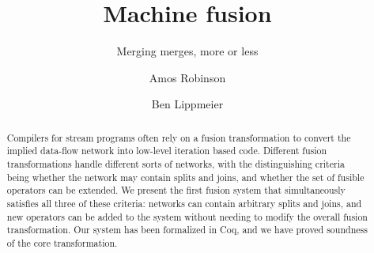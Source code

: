 \documentclass[acmlarge,review]{acmart}\settopmatter{printfolios=true}
\begin{document}
\title{Machine fusion}
\subtitle{Merging merges, more or less}

\author{Amos Robinson}

\author{Ben Lippmeier}

\makeatactive
\begin{abstract}
Compilers for stream programs often rely on a fusion transformation to convert the implied data-flow network into low-level iteration based code. Different fusion transformations handle different sorts of networks, with the distinguishing criteria being whether the network may contain splits and joins, and whether the set of fusible operators can be extended. We present the first fusion system that simultaneously satisfies all three of these criteria: networks can contain arbitrary splits and joins, and new operators can be added to the system without needing to modify the overall fusion transformation. Our system has been formalized in Coq, and we have proved soundness of the core transformation.
\end{abstract}


\maketitle











\clearpage{}

\end{document}
